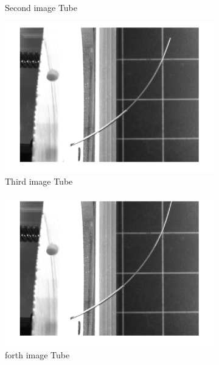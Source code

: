 \documentclass[12pt, twoside]{report}
\begin{document}
\begin{figure}[H]
\begin{subfigure}[b]{0.3\textwidth}
         \caption{Second image Tube}
         \label{fig:process2}
     \end{subfigure}
     \hfill
     \begin{subfigure}[b]{0.3\textwidth}
         \centering
         \includegraphics[width=\textwidth]{TP_1/curve3i.jpg}
         \caption{Third image Tube}
         \label{fig:process3}
     \end{subfigure}
      \hfill
     \begin{subfigure}[b]{0.3\textwidth}
         \centering
         \includegraphics[width=\textwidth]{TP_1/curve4i.jpg}
         \caption{forth image Tube}
         \label{fig:process4}
     \end{subfigure}
      \hfill
     \begin{subfigure}[b]{0.3\textwidth}

\end{subfigure}
\end{figure}
\end{document}
